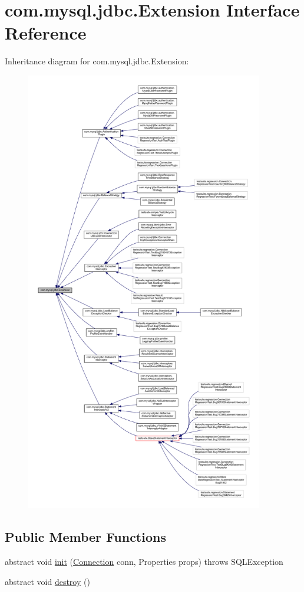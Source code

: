 \hypertarget{interfacecom_1_1mysql_1_1jdbc_1_1_extension}{}\section{com.\+mysql.\+jdbc.\+Extension Interface Reference}
\label{interfacecom_1_1mysql_1_1jdbc_1_1_extension}


Inheritance diagram for com.\+mysql.\+jdbc.\+Extension\+:
\nopagebreak
\begin{figure}[H]
\begin{center}
\leavevmode
\includegraphics[height=550pt]{interfacecom_1_1mysql_1_1jdbc_1_1_extension__inherit__graph}
\end{center}
\end{figure}
\subsection*{Public Member Functions}
\begin{DoxyCompactItemize}
\item 
abstract void \mbox{\hyperlink{interfacecom_1_1mysql_1_1jdbc_1_1_extension_a79427811058193260bd4df0c38414e88}{init}} (\mbox{\hyperlink{interfacecom_1_1mysql_1_1jdbc_1_1_connection}{Connection}} conn, Properties props)  throws S\+Q\+L\+Exception
\item 
abstract void \mbox{\hyperlink{interfacecom_1_1mysql_1_1jdbc_1_1_extension_a7d9644de305efed5df71f3fcc7cc1772}{destroy}} ()
\end{DoxyCompactItemize}



